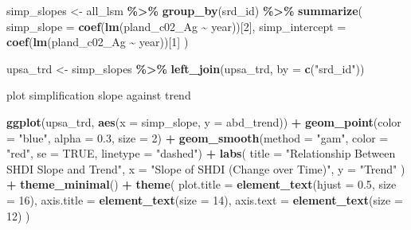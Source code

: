 \documentclass[
]{article}
\newenvironment{Shaded}{\begin{snugshade}}{\end{snugshade}}
\newcommand{\AttributeTok}[1]{\textcolor[rgb]{0.13,0.29,0.53}{#1}}
\newcommand{\ConstantTok}[1]{\textcolor[rgb]{0.56,0.35,0.01}{#1}}
\newcommand{\DecValTok}[1]{\textcolor[rgb]{0.00,0.00,0.81}{#1}}
\newcommand{\FloatTok}[1]{\textcolor[rgb]{0.00,0.00,0.81}{#1}}
\newcommand{\FunctionTok}[1]{\textcolor[rgb]{0.13,0.29,0.53}{\textbf{#1}}}
\newcommand{\NormalTok}[1]{#1}
\newcommand{\OtherTok}[1]{\textcolor[rgb]{0.56,0.35,0.01}{#1}}
\newcommand{\SpecialCharTok}[1]{\textcolor[rgb]{0.81,0.36,0.00}{\textbf{#1}}}
\newcommand{\StringTok}[1]{\textcolor[rgb]{0.31,0.60,0.02}{#1}}
\begin{document}
\begin{Shaded}
\begin{Highlighting}[]
\NormalTok{simp\_slopes }\OtherTok{\textless{}{-}}\NormalTok{ all\_lsm }\SpecialCharTok{\%\textgreater{}\%}
  \FunctionTok{group\_by}\NormalTok{(srd\_id) }\SpecialCharTok{\%\textgreater{}\%}
  \FunctionTok{summarize}\NormalTok{(}
    \AttributeTok{simp\_slope =} \FunctionTok{coef}\NormalTok{(}\FunctionTok{lm}\NormalTok{(pland\_c02\_Ag }\SpecialCharTok{\textasciitilde{}}\NormalTok{ year))[}\DecValTok{2}\NormalTok{],  }
    \AttributeTok{simp\_intercept =} \FunctionTok{coef}\NormalTok{(}\FunctionTok{lm}\NormalTok{(pland\_c02\_Ag }\SpecialCharTok{\textasciitilde{}}\NormalTok{ year))[}\DecValTok{1}\NormalTok{] }
\NormalTok{  )}

\NormalTok{upsa\_trd }\OtherTok{\textless{}{-}}\NormalTok{ simp\_slopes }\SpecialCharTok{\%\textgreater{}\%}
  \FunctionTok{left\_join}\NormalTok{(upsa\_trd, }\AttributeTok{by =} \FunctionTok{c}\NormalTok{(}\StringTok{"srd\_id"}\NormalTok{))}
\end{Highlighting}
\end{Shaded}

plot simplification slope against trend

\begin{Shaded}
\begin{Highlighting}[]
\FunctionTok{ggplot}\NormalTok{(upsa\_trd, }\FunctionTok{aes}\NormalTok{(}\AttributeTok{x =}\NormalTok{ simp\_slope, }\AttributeTok{y =}\NormalTok{ abd\_trend)) }\SpecialCharTok{+}
  \FunctionTok{geom\_point}\NormalTok{(}\AttributeTok{color =} \StringTok{"blue"}\NormalTok{, }\AttributeTok{alpha =} \FloatTok{0.3}\NormalTok{, }\AttributeTok{size =} \DecValTok{2}\NormalTok{) }\SpecialCharTok{+}  
  \FunctionTok{geom\_smooth}\NormalTok{(}\AttributeTok{method =} \StringTok{"gam"}\NormalTok{, }\AttributeTok{color =} \StringTok{"red"}\NormalTok{, }\AttributeTok{se =} \ConstantTok{TRUE}\NormalTok{, }\AttributeTok{linetype =} \StringTok{"dashed"}\NormalTok{) }\SpecialCharTok{+} 
  \FunctionTok{labs}\NormalTok{(}
    \AttributeTok{title =} \StringTok{"Relationship Between SHDI Slope and Trend"}\NormalTok{,}
    \AttributeTok{x =} \StringTok{"Slope of SHDI (Change over Time)"}\NormalTok{,}
    \AttributeTok{y =} \StringTok{"Trend"}
\NormalTok{  ) }\SpecialCharTok{+}
  \FunctionTok{theme\_minimal}\NormalTok{() }\SpecialCharTok{+}
  \FunctionTok{theme}\NormalTok{(}
    \AttributeTok{plot.title =} \FunctionTok{element\_text}\NormalTok{(}\AttributeTok{hjust =} \FloatTok{0.5}\NormalTok{, }\AttributeTok{size =} \DecValTok{16}\NormalTok{),}
    \AttributeTok{axis.title =} \FunctionTok{element\_text}\NormalTok{(}\AttributeTok{size =} \DecValTok{14}\NormalTok{),}
    \AttributeTok{axis.text =} \FunctionTok{element\_text}\NormalTok{(}\AttributeTok{size =} \DecValTok{12}\NormalTok{)}
\NormalTok{  )}
\end{Highlighting}
\end{Shaded}
\end{document}
